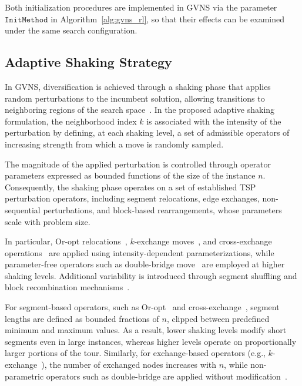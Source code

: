 \documentclass[runningheads]{llncs}
\begin{document}
Both initialization procedures are implemented in GVNS via the parameter $\texttt{InitMethod}$ in Algorithm~\ref{alg:gvns_rl}, so that their effects can be examined under the same search configuration.




\subsection{Adaptive Shaking Strategy}
\label{subsec:shaking}

In GVNS, diversification is achieved through a shaking phase that applies random perturbations to the incumbent solution, allowing transitions to neighboring regions of the search space~\cite{hansen2008vns}. 
In the proposed adaptive shaking formulation, the neighborhood index $k$ is associated with the intensity of the perturbation by defining, at each shaking level, a set of admissible operators of increasing strength from which a move is randomly sampled.

The magnitude of the applied perturbation is controlled through operator parameters expressed as bounded functions of the size of the instance $n$. 
Consequently, the shaking phase operates on a set of established TSP perturbation operators, including segment relocations, edge exchanges, non-sequential perturbations, and block-based rearrangements, whose parameters scale with problem size. 

In particular, Or-opt relocations~\cite{Babin2007}, $k$-exchange moves~\cite{MARX200831}, and cross-exchange operations~\cite{taillard1997tabu} are applied using intensity-dependent parameterizations, while parameter-free operators such as double-bridge move~\cite{bentley1992fast,hoos2018stochastic} are employed at higher shaking levels. Additional variability is introduced through segment shuffling and block recombination mechanisms~\cite{Papalitsas}.

For segment-based operators, such as Or-opt~\cite{Babin2007} and cross-exchange~\cite{taillard1997tabu}, segment lengths are defined as bounded fractions of $n$, clipped between predefined minimum and maximum values. 
As a result, lower shaking levels modify short segments even in large instances, whereas higher levels operate on proportionally larger portions of the tour. 
Similarly, for exchange-based operators (e.g., $k$-exchange~\cite{MARX200831}), the number of exchanged nodes increases with $n$, while non-parametric operators such as double-bridge are applied without modification~\cite{bentley1992fast,hoos2018stochastic}.
\end{document}
